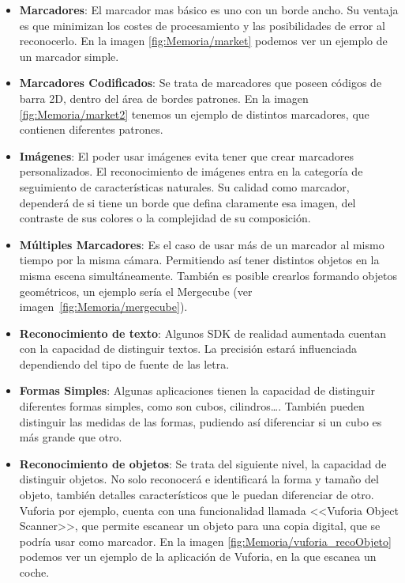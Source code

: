 \begin{itemize}
	\item \textbf{Marcadores}: El marcador mas básico es uno con un borde ancho. Su ventaja es que minimizan los costes de procesamiento y las posibilidades de error al reconocerlo. En la imagen \ref{fig:Memoria/market} podemos ver un ejemplo de un marcador simple.\\		
	\item \textbf{Marcadores Codificados}:
	Se trata de marcadores que poseen códigos de barra 2D, dentro del área de bordes patrones. En la imagen \ref{fig:Memoria/market2} tenemos un ejemplo de distintos marcadores, que contienen diferentes patrones.
	\item \textbf{Imágenes}:		
	El poder usar imágenes evita tener que crear marcadores personalizados. El reconocimiento de imágenes entra en la categoría de seguimiento de características naturales. Su calidad como marcador, dependerá de si tiene un borde que defina claramente esa imagen, del contraste de sus colores o la complejidad de su composición.
	\item \textbf{Múltiples Marcadores}:
	Es el caso de usar más de un marcador al mismo tiempo por la misma cámara. Permitiendo así tener distintos objetos en la misma escena simultáneamente. También es posible crearlos formando objetos geométricos, un ejemplo sería el Mergecube (ver imagen~\ref{fig:Memoria/mergecube}).
	\item \textbf{Reconocimiento de texto}:
	Algunos SDK de realidad aumentada cuentan con la capacidad de distinguir textos. La precisión estará influenciada dependiendo del tipo de fuente de las letra. 
	\item \textbf{Formas Simples}:
	Algunas aplicaciones tienen la capacidad de distinguir diferentes formas simples, como son cubos, cilindros\dots. También pueden distinguir las medidas de las formas, pudiendo así diferenciar si un cubo es más grande que otro.
	\item \textbf{Reconocimiento de objetos}:		
	Se trata del siguiente nivel, la capacidad de distinguir objetos. No solo reconocerá e identificará la forma y tamaño del objeto, también detalles característicos que le puedan diferenciar de otro. Vuforia por ejemplo, cuenta con una funcionalidad llamada <<Vuforia Object Scanner>>, que permite escanear un objeto para una copia digital, que se podría usar como marcador. En la imagen \ref{fig:Memoria/vuforia_recoObjeto} podemos ver un ejemplo de la aplicación de Vuforia, en la que escanea un coche.  
	
\end{itemize}

